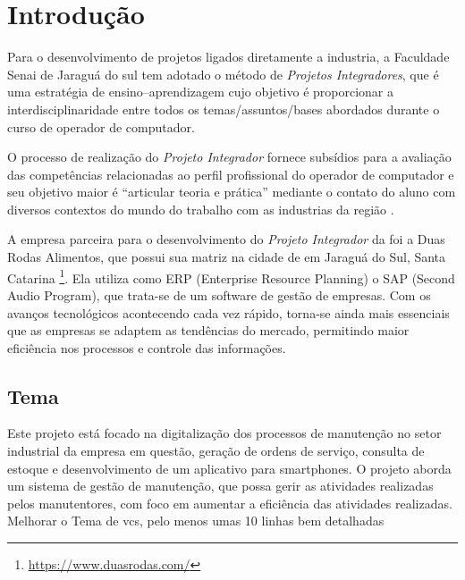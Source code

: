 
\chapter{Introdução}

{\color{red}
	
Para o desenvolvimento de projetos ligados diretamente a industria, a Faculdade Senai de Jaraguá do sul tem adotado o método de \textit{Projetos Integradores}, que é uma estratégia de ensino–aprendizagem cujo objetivo é proporcionar a interdisciplinaridade entre todos os temas/assuntos/bases abordados durante o curso de operador de computador.

O processo de realização do \textit{Projeto Integrador} fornece subsídios para a avaliação das competências relacionadas ao perfil profissional do operador de computador e seu objetivo maior é “articular teoria e prática” mediante o contato do aluno com diversos contextos do mundo do trabalho com as industrias da região \cite{magalhaes2019uso}.  

A empresa parceira para o desenvolvimento do \textit{Projeto Integrador} da foi a Duas Rodas Alimentos,  que  possui sua matriz na cidade de  em Jaraguá do Sul, Santa Catarina  \footnote{\url{ https://www.duasrodas.com/}}.  Ela utiliza como ERP (Enterprise Resource Planning) o SAP (Second Audio Program), que trata-se de um software de gestão de empresas.
Com os avanços tecnológicos acontecendo cada vez rápido, torna-se ainda mais essenciais que as empresas se adaptem as tendências do mercado, permitindo maior eficiência nos processos e controle das informações.

}
% 


\section{Tema}
Este projeto está focado na digitalização dos processos de manutenção no setor industrial da empresa em questão, geração de ordens de serviço, consulta de estoque e desenvolvimento de um aplicativo para smartphones. O projeto aborda um sistema de gestão de manutenção, que possa gerir as atividades realizadas pelos manutentores, com foco em aumentar a eficiência das atividades realizadas.
{\color{red} Melhorar o Tema de vcs, pelo menos umas 10 linhas bem detalhadas}
